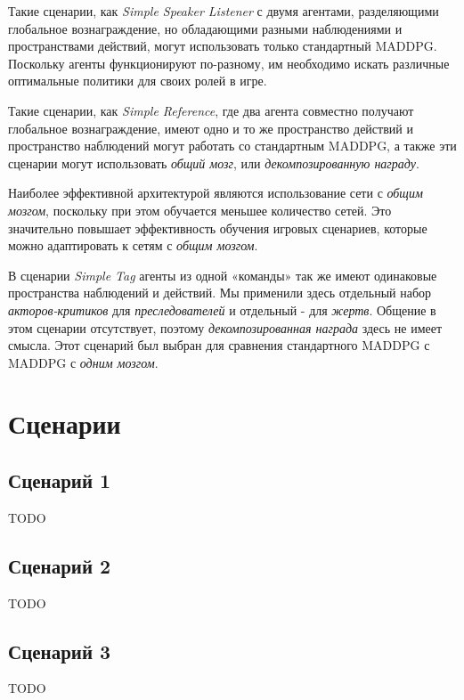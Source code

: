 Такие сценарии, как \textit{Simple Speaker Listener} с двумя агентами, разделяющими глобальное вознаграждение, но обладающими разными наблюдениями и пространствами действий, могут использовать только стандартный MADDPG. Поскольку агенты функционируют по-разному, им необходимо искать различные оптимальные политики для своих ролей в игре.

Такие сценарии, как \textit{Simple Reference}, где два агента совместно получают глобальное вознаграждение, имеют одно и то же пространство действий и пространство наблюдений могут работать со стандартным MADDPG, а также эти сценарии могут использовать \textit{общий мозг}, или \textit{декомпозированную награду}.

Наиболее эффективной архитектурой являются использование сети с \textit{общим мозгом}, поскольку при этом обучается меньшее количество сетей. Это значительно повышает эффективность обучения игровых сценариев, которые можно адаптировать к сетям с \textit{общим мозгом}. 

В сценарии \textit{Simple Tag} агенты из одной «команды» так же имеют одинаковые пространства наблюдений и действий. Мы применили здесь отдельный набор \textit{акторов-критиков} для \textit{преследователей} и отдельный - для \textit{жертв}. Общение в этом сценарии отсутствует, поэтому \textit{декомпозированная награда} здесь не имеет смысла. Этот сценарий был выбран для сравнения стандартного MADDPG с MADDPG с \textit{одним мозгом}.


\section{Сценарии}

\subsection{Сценарий 1}

TODO

\subsection{Сценарий 2}

TODO

\subsection{Сценарий 3}

TODO

\newpage
